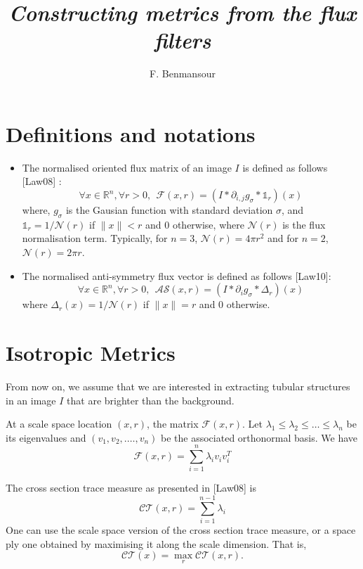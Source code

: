 \documentclass[11pt]{amsart}
\author {F. Benmansour}
\title{\textit{Constructing metrics from the flux filters}}
\begin{document}
\maketitle

\section{Definitions and notations}
\begin{itemize}
\item The normalised oriented flux matrix of an image $I$ is defined as follows [Law08] :
\begin{equation}\label{eq:OF}
\forall x\in\mathbb{R}^n,\forall r >0, ~~\mathcal{F}(x, r) = (I* \partial_{i, j} g_{\sigma} *\mathds{1}_r)(x)
\end{equation}
where, $g_\sigma$ is the Gausian function with standard deviation $\sigma$, and $\mathds{1}_r = 1/ \mathcal{N}(r)$ if $\|x\| < r$ and 0 otherwise, where $\mathcal{N}(r)$ is the flux normalisation term. Typically, for $n = 3$,  $\mathcal{N}(r) = 4\pi r^2$ and for $n = 2$, $\mathcal{N}(r) = 2\pi r$.
\item The normalised anti-symmetry flux vector is defined as follows [Law10]:
\begin{equation}\label{eq:AF}
\forall x\in\mathbb{R}^n,\forall r >0, ~~\mathcal{AS}(x, r) = (I* \partial_{i} g_{\sigma} *\Delta_r)(x)
\end{equation}
where $\Delta_r(x) = 1/ \mathcal{N}(r)$ if $\|x\| = r$ and 0 otherwise.
\end{itemize}

\section{Isotropic Metrics}
From now on, we assume that we are interested in extracting tubular structures in an image $I$ that are brighter than the background.

At a scale space location $(x, r)$, the matrix $\mathcal{F}(x, r)$. Let $\lambda_1\leq \lambda_2\leq\dots\leq\lambda_n$ be its eigenvalues and $(v_1, v_2, .\dots, v_n)$ be the associated orthonormal basis. We have 
\begin{equation}\label{eq:diago}
\mathcal{F}(x, r) = \sum_{i=1}^n \lambda_i v_i v_i^T
\end{equation}

The cross section trace measure as presented in [Law08] is 
\begin{equation}\label{eq:CrossSectionTrace}
\mathcal{CT}(x, r) = \sum_{i=1}^{n-1} \lambda_i 
\end{equation}
One can use the scale space version of the cross section trace measure, or a space ply one obtained by maximising it along the scale dimension. That is,
\begin{equation}\label{eq:CrossSectionTraceSpace}
\mathcal{CT}(x) = \max_{r} \mathcal{CT}(x, r).
\end{equation}
\end{document}
